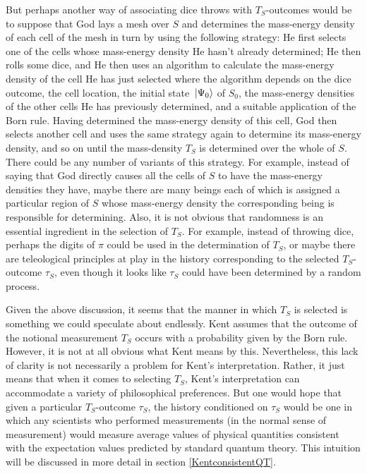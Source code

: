 But perhaps another way of associating dice throws with $T_S$-outcomes would be to suppose that God lays a mesh over $S$ and determines the mass-energy density of each cell of the mesh in turn by using the following strategy: He first selects one of the cells whose mass-energy density He hasn't already determined; He then rolls some dice, and He then uses an algorithm to calculate the mass-energy density of the cell He has just selected where the algorithm depends on the dice outcome, the cell location, the initial state $\ket*{\Psi_0}$ of $S_0$, the mass-energy densities of the other cells He has previously determined, and a suitable application of the Born rule. Having determined the mass-energy density of this cell, God then selects another cell and uses the same strategy again to determine its mass-energy density, and so on until the mass-density $T_S$ is determined over the whole of $S$. There could be any number of variants of this strategy. For example, instead of saying that God directly causes all the cells of $S$ to have the mass-energy densities they have, maybe there are many beings each of which is assigned a particular region of $S$ whose mass-energy density the corresponding being is responsible for determining. Also, it is not obvious that randomness is an essential ingredient in the selection of $T_S$. For example, instead of throwing dice, perhaps the digits of $\pi$ could be used in the determination of $T_S$, or maybe there are teleological principles at play in the history corresponding to the selected $T_S$-outcome $\tau_S$, even though it looks like $\tau_S$ could have been determined by a random process. 

Given the above discussion, it seems that the manner in which $T_S$ is selected is something we could speculate about endlessly. Kent assumes that the outcome of the notional measurement $T_S$ occurs with a probability given by the Born rule. However, it is not at all obvious what Kent means by this. Nevertheless, this lack of clarity is not necessarily a problem for Kent's interpretation. Rather, it just means that when it comes to selecting $T_S$, Kent's interpretation can accommodate a variety of philosophical preferences. But one would hope that given a particular $T_S$-outcome $\tau_S$, the history conditioned on $\tau_S$ would be one in which any scientists who performed measurements (in the normal sense of measurement) would measure average values of physical quantities consistent with the expectation values predicted by standard quantum theory. This intuition will be discussed in more detail in section \ref{KentconsistentQT}.\label{selectionmeaningend}




